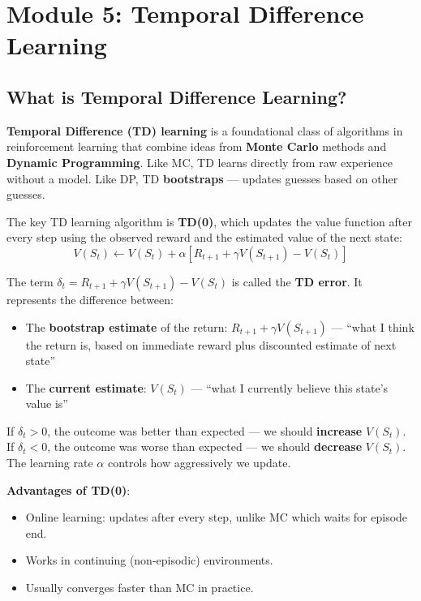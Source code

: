 \documentclass[11pt,a4paper]{article}
\begin{document}
\section{Module 5: Temporal Difference Learning}

\subsection{What is Temporal Difference Learning?}

\textbf{Temporal Difference (TD) learning} is a foundational class of algorithms in reinforcement learning that combine ideas from \textbf{Monte Carlo} methods and \textbf{Dynamic Programming}. Like MC, TD learns directly from raw experience without a model. Like DP, TD \textbf{bootstraps} --- updates guesses based on other guesses.

The key TD learning algorithm is \textbf{TD(0)}, which updates the value function after every step using the observed reward and the estimated value of the next state:
\[
V(S_t) \leftarrow V(S_t) + \alpha [R_{t+1} + \gamma V(S_{t+1}) - V(S_t)]
\]

The term $\delta_t = R_{t+1} + \gamma V(S_{t+1}) - V(S_t)$ is called the \textbf{TD error}. It represents the difference between:
\begin{itemize}
    \item The \textbf{bootstrap estimate} of the return: $R_{t+1} + \gamma V(S_{t+1})$ --- ``what I think the return is, based on immediate reward plus discounted estimate of next state''
    \item The \textbf{current estimate}: $V(S_t)$ --- ``what I currently believe this state's value is''
\end{itemize}

If $\delta_t > 0$, the outcome was better than expected --- we should \textbf{increase} $V(S_t)$. If $\delta_t < 0$, the outcome was worse than expected --- we should \textbf{decrease} $V(S_t)$. The learning rate $\alpha$ controls how aggressively we update.

\textbf{Advantages of TD(0)}:
\begin{itemize}
    \item Online learning: updates after every step, unlike MC which waits for episode end.
    \item Works in continuing (non-episodic) environments.
    \item Usually converges faster than MC in practice.
\end{itemize}
\end{document}

